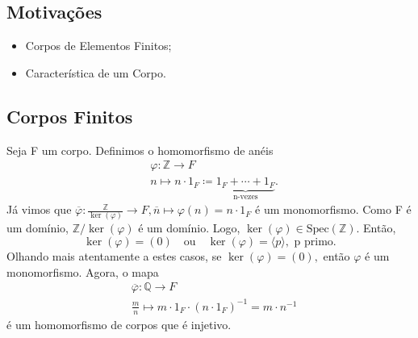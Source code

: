 \documentclass{article}
\begin{document}
    \subsection{Motivações}
    \begin{itemize}
      \item Corpos de Elementos Finitos;
      \item Característica de um Corpo.
    \end{itemize}
    \subsection{Corpos Finitos}
    Seja F um corpo. Definimos o homomorfismo de anéis
    \begin{align*}
  &\varphi :\mathbb{Z}\rightarrow F\\
  &n\mapsto n \cdot 1_{F}\coloneqq \underbrace{1_{F} + \cdots + 1_{F}}_{\text{n-vezes}}.
    \end{align*}
    Já vimos que \(\overline{\varphi }:\frac{\mathbb{Z}}{\ker{(\varphi )}}\rightarrow F, \overline{n}\mapsto \varphi (n)=n \cdot 1_{F}\) é um monomorfismo. Como F é um
    domínio, \(\mathbb{Z}/\ker{(\varphi )}\) é um domínio. Logo, \(\ker{(\varphi )}\in \mathrm{Spec}(\mathbb{Z}).\) Então, 
    \[
      \ker{(\varphi )} = (0)\quad\text{ou}\quad \ker{(\varphi )}=\langle p \rangle,\text{ p primo.}
    \]
    Olhando mais atentamente a estes casos, se \(\ker{(\varphi )} = (0),\) então \(\varphi \) é um monomorfismo. Agora, 
    o mapa 
    \begin{align*}
   &\overline{\varphi }:\mathbb{Q}\rightarrow F\\
   &\frac{m}{n}\mapsto m \cdot 1_{F} \cdot (n \cdot 1_{F})^{-1} = m \cdot n^{-1}
    \end{align*}
    é um homomorfismo de corpos que é injetivo.
\end{document}
